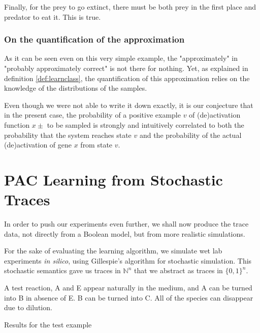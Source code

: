 \documentclass{llncs}
\begin{document}
Finally, for the prey to go extinct, there must be both prey in the first place and predator to eat it. This is true.

\subsubsection{On the quantification of the approximation}

As it can be seen even on this very simple example, the "approximately" in "probably approximately correct" is not there for nothing. Yet, as explained in definition \ref{def:learnclass}, the quantification of this approximation relies on the knowledge of the distributions of the samples.

Even though we were not able to write it down exactly, it is our conjecture that in the present case, the probability of a positive example $v$ of (de)activation function $x\pm$ to be sampled is strongly and intuitively correlated to both the probability that the system reaches state $v$ and the probability of the actual (de)activation of gene $x$ from state $v$. 



\section{PAC Learning from Stochastic Traces}

In order to push our experiments even further, we shall now produce the trace
data, not directly from a Boolean model, but from more realistic simulations.

For the sake of evaluating the learning algorithm,
we simulate wet lab experiments \emph{in silico}, using Gillespie's algorithm for stochastic simulation.
This stochastic semantics gave us traces in ${\mathbb{N}}^n$ that we abstract as traces in ${\{0,1\}}^n$.

\begin{listfig}[hp]
	
	\vspace{-1em}
	\caption{A test reaction, A and E appear naturally in the medium, and A can be turned into B in absence of E. B  can be turned into C. All of the species can disappear due to dilution.\label{test}}
\end{listfig}
\begin{listfig}[hp]
	
	\vspace{-1em}
	\caption{Results for the test example\label{test_res}}
\end{listfig}
\end{document}
